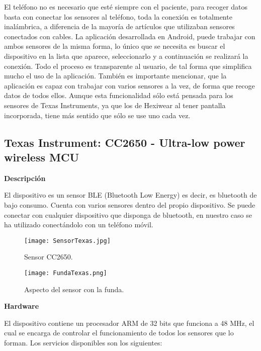 El teléfono no es necesario que esté siempre con el paciente, para recoger datos basta con conectar los sensores al teléfono, toda la conexión es totalmente inalámbrica, a diferencia de la mayoría de artículos que utilizaban sensores conectados con cables. La aplicación desarrollada en Android, puede trabajar con ambos sensores de la misma forma, lo único que se necesita es buscar el dispositivo en la lista que aparece, seleccionarlo y a continuación se realizará la conexión. Todo el proceso es transparente al usuario, de tal forma que simplifica mucho el uso de la aplicación. También es importante mencionar, que la aplicación es capaz con trabajar con varios sensores a la vez, de forma que recoge datos de todos ellos. Aunque esta funcionalidad sólo está pensada para los sensores de Texas Instruments, ya que los de Hexiwear al tener pantalla incorporada, tiene más sentido que sólo se use uno cada vez.
\newline

\subsection{Texas Instrument: CC2650 - Ultra-low power wireless MCU}
{\bf Descripción}
\newline

El dispositivo es un sensor BLE (Bluetooth Low Energy) es decir, es bluetooth de bajo consumo. Cuenta con varios sensores dentro del propio dispositivo. Se puede conectar con cualquier dispositivo que disponga de bluetooth, en nuestro caso se ha utilizado conectándolo con un teléfono móvil. 
\newline

\begin{figure}[h!]
  \centering
  \texttt{[image: SensorTexas.jpg]}
  \caption{Sensor CC2650.}
\end{figure}

\begin{figure}[h!]
  \centering
  \texttt{[image: FundaTexas.png]}
  \caption{Aspecto del sensor con la funda.}
\end{figure}
\newpage

{\bf Hardware}
\newline

El dispositivo contiene un procesador ARM de 32 bits que funciona a 48 MHz, el cual se encarga de controlar el funcionamiento de todos los sensores que lo forman. Los servicios disponibles son los siguientes:

